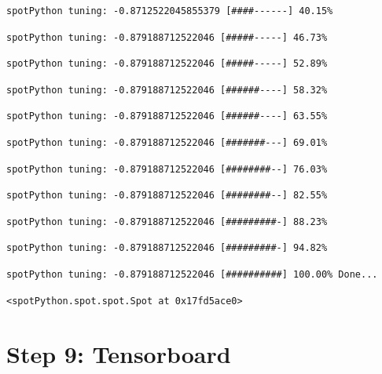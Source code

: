 \documentclass[
  letterpaper,
  DIV=11,
  numbers=noendperiod]{scrreprt}
\begin{document}
\begin{verbatim}
spotPython tuning: -0.8712522045855379 [####------] 40.15% 
\end{verbatim}

\begin{verbatim}
spotPython tuning: -0.879188712522046 [#####-----] 46.73% 
\end{verbatim}

\begin{verbatim}
spotPython tuning: -0.879188712522046 [#####-----] 52.89% 
\end{verbatim}

\begin{verbatim}
spotPython tuning: -0.879188712522046 [######----] 58.32% 
\end{verbatim}

\begin{verbatim}
spotPython tuning: -0.879188712522046 [######----] 63.55% 
\end{verbatim}

\begin{verbatim}
spotPython tuning: -0.879188712522046 [#######---] 69.01% 
\end{verbatim}

\begin{verbatim}
spotPython tuning: -0.879188712522046 [########--] 76.03% 
\end{verbatim}

\begin{verbatim}
spotPython tuning: -0.879188712522046 [########--] 82.55% 
\end{verbatim}

\begin{verbatim}
spotPython tuning: -0.879188712522046 [#########-] 88.23% 
\end{verbatim}

\begin{verbatim}
spotPython tuning: -0.879188712522046 [#########-] 94.82% 
\end{verbatim}

\begin{verbatim}
spotPython tuning: -0.879188712522046 [##########] 100.00% Done...
\end{verbatim}

\begin{verbatim}
<spotPython.spot.spot.Spot at 0x17fd5ace0>
\end{verbatim}

\hypertarget{sec-tensorboard-16}{%
\section{Step 9: Tensorboard}\label{sec-tensorboard-16}}
\end{document}
